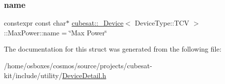 \subsubsection{\texorpdfstring{name}{name}}
{\footnotesize\ttfamily constexpr const char$\ast$ \hyperlink{structcubesat_1_1__Device}{cubesat\+::\+\_\+\+Device}$<$ Device\+Type\+::\+T\+CV $>$\+::Max\+Power\+::name = \char`\"{}Max Power\char`\"{}\hspace{0.3cm}{\ttfamily [static]}}



The documentation for this struct was generated from the following file\+:\begin{DoxyCompactItemize}
\item 
/home/osboxes/cosmos/source/projects/cubesat-\/kit/include/utility/\hyperlink{DeviceDetail_8h}{Device\+Detail.\+h}\end{DoxyCompactItemize}
